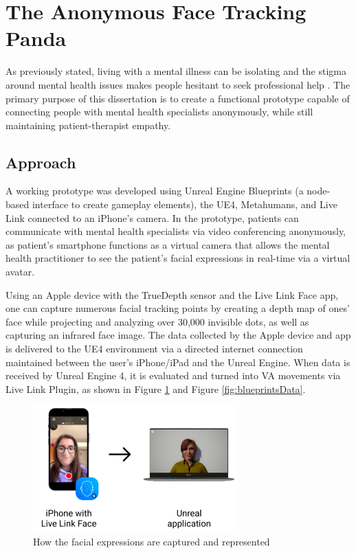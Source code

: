 \section{The Anonymous Face Tracking Panda}
As previously stated, living with a mental illness can be isolating and the stigma around mental health issues makes people hesitant to seek professional help \cite{HAM18}. The primary purpose of this dissertation is to create a functional prototype capable of connecting people with mental health specialists anonymously, while still maintaining patient-therapist empathy.

\subsection{Approach}
A working prototype was developed using Unreal Engine Blueprints (a node-based interface to create gameplay elements), the UE4, Metahumans, and Live Link connected to an iPhone's camera. In the prototype, patients can communicate with mental health specialists via video conferencing anonymously, as patient's smartphone functions as a virtual camera that allows the mental health practitioner to see the patient's facial expressions in real-time via a virtual avatar.

Using an Apple device with the TrueDepth sensor and the Live Link Face app, one can capture numerous facial tracking points by creating a depth map of ones’ face while projecting and analyzing over 30,000 invisible dots, as well as capturing an infrared face image. The data collected by the Apple device and app is delivered to the UE4 environment via a directed internet connection maintained between the user's iPhone/iPad and the Unreal Engine. When data is received by Unreal Engine 4, it is evaluated and turned into VA movements via Live Link Plugin, as shown in Figure \ref{fig:facialExpressions} and Figure \ref{fig:blueprintsData}.

\begin{figure}[!htb]
\includegraphics[width=0.7\textwidth]{figures/howItWorks.png}
\centering
\caption{How the facial expressions are captured and represented}
\label{fig:facialExpressions}
\end{figure}

